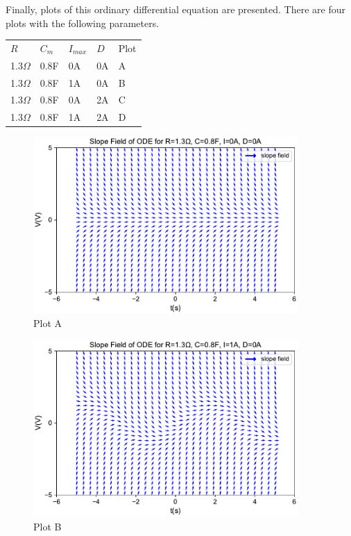 \documentclass{scrartcl}
\begin{document}
Finally, plots of this ordinary differential equation are presented. There are four plots with the following parameters.


\begin{table}[h]
\vspace{0.5cm}
\centering
\begin{tabular}{|l|l|l|l|l|}
\hline
$R$                      & $C_{m}$ & $I_{max}$ & $D$ & Plot \\ \hhline{|=|=|=|=|=|}

1.3$\Omega$ & 0.8F    & 0A        & 0A  & A    \\ \hline
1.3$\Omega$ & 0.8F    & 1A        & 0A  & B    \\ \hline
1.3$\Omega$ & 0.8F    & 0A        & 2A  & C    \\ \hline
1.3$\Omega$ & 0.8F    & 1A        & 2A  & D    \\ \hline
\end{tabular}
\label{tab:values}
\end{table}

\begin{figure}[h]
	\centering
	\includegraphics[width=0.9\textwidth]{figures/ode_3_i0_d0.pdf}
	\caption{Plot A}
\end{figure}

\begin{figure}[h]
	\centering
	\includegraphics[width=0.9\textwidth]{figures/ode_3_i1_d0.pdf}
	\caption{Plot B}
\end{figure}
\end{document}
